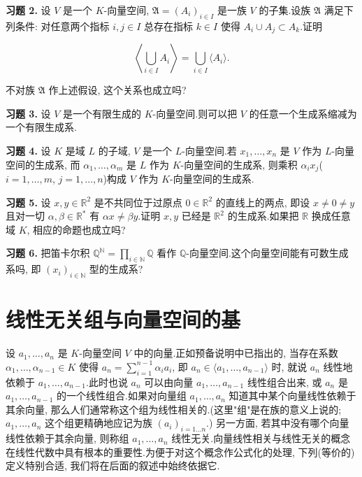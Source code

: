 \medskip
\noindent\textbf{习题 2.} 设 $V$ 是一个 $K$-向量空间, $\mathfrak{A} = (A_i)_{i \in I}$ 是一族 $V$ 的子集.设族 $\mathfrak{A}$ 满足下列条件: 对任意两个指标 $i, j \in I$ 总存在指标 $k \in I$ 使得 $A_i \cup A_j \subset A_k$.证明

\[
\left\langle \bigcup_{i \in I} A_i \right\rangle = \bigcup_{i \in I} \langle A_i \rangle\text{.}
\]

不对族 $\mathfrak{A}$ 作上述假设, 这个关系也成立吗?

\medskip
\noindent\textbf{习题 3.} 设 $V$ 是一个有限生成的 $K$-向量空间.则可以把 $V$ 的任意一个生成系缩减为一个有限生成系.

\medskip
\noindent\textbf{习题 4.} 设 $K$ 是域 $L$ 的子域, $V$ 是一个 $L$-向量空间.若 $x_1, \ldots, x_n$ 是 $V$ 作为 $L$-向量空间的生成系, 而 $\alpha_1, \ldots, \alpha_m$ 是 $L$ 作为 $K$-向量空间的生成系, 则乘积 $\alpha_i x_j$($i = 1, \ldots, m$, $j = 1, \ldots, n$)构成 $V$ 作为 $K$-向量空间的生成系.

\medskip
\noindent\textbf{习题 5.} 设 $x, y \in \mathbb{R}^2$ 是不共同位于过原点 $0 \in \mathbb{R}^2$ 的直线上的两点, 即设 $x \neq 0 \neq y$ 且对一切 $\alpha, \beta \in \mathbb{R}^*$ 有 $\alpha x \neq \beta y$.证明 $x, y$ 已经是 $\mathbb{R}^2$ 的生成系.如果把 $\mathbb{R}$ 换成任意域 $K$, 相应的命题也成立吗?

\medskip
\noindent\textbf{习题 6.} 把笛卡尔积 $\mathbb{Q}^{\mathbb{N}} = \prod_{i \in \mathbb{N}} \mathbb{Q}$ 看作 $\mathbb{Q}$-向量空间.这个向量空间能有可数生成系吗, 即 $(x_i)_{i \in \mathbb{N}}$ 型的生成系?

\section{线性无关组与向量空间的基}\label{sec:1.5}

设 $a_1, \ldots, a_n$ 是 $K$-向量空间 $V$ 中的向量.正如预备说明中已指出的, 当存在系数 $\alpha_1, \ldots, \alpha_{n-1} \in K$ 使得 $a_n = \sum_{i = 1}^{n-1} \alpha_i a_i$, 即 $a_n \in \langle a_1, \ldots, a_{n-1} \rangle$ 时, 就说 $a_n$ 线性地依赖于 $a_1, \ldots, a_{n-1}$.此时也说 $a_n$ 可以由向量 $a_1, \ldots, a_{n-1}$ 线性组合出来, 或 $a_n$ 是 $a_1, \ldots, a_{n-1}$ 的一个线性组合.如果对向量组 $a_1, \ldots, a_n$ 知道其中某个向量线性依赖于其余向量, 那么人们通常称这个组为线性相关的.(这里"组"是在族的意义上说的; $a_1, \ldots, a_n$ 这个组更精确地应记为族 $(a_i)_{i = 1 \ldots n}$.) 另一方面, 若其中没有哪个向量线性依赖于其余向量, 则称组 $a_1, \ldots, a_n$ 线性无关.向量线性相关与线性无关的概念在线性代数中具有根本的重要性.为便于对这个概念作公式化的处理, 下列(等价的)定义特别合适, 我们将在后面的叙述中始终依据它.

